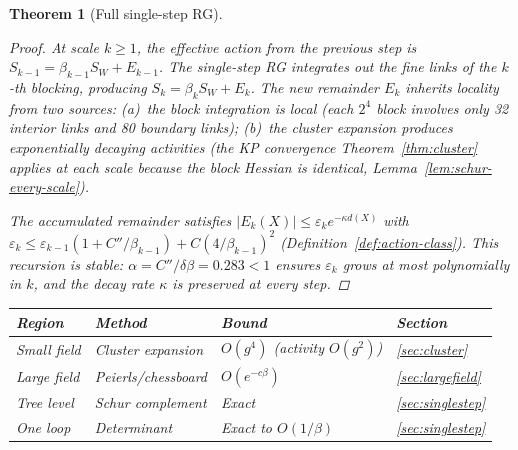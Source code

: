 \documentclass[11pt]{article}
\newtheorem{theorem}{Theorem}[section]
\theoremstyle{definition}
\begin{document}
\begin{theorem}[Full single-step RG]
\begin{proof}
At scale $k\ge 1$, the effective action from the previous step
is $S_{k-1}=\beta_{k-1}S_W+E_{k-1}$.  The single-step RG
integrates out the fine links of the $k$-th blocking, producing
$S_k=\beta_k S_W+E_k$.  The new remainder $E_k$ inherits
locality from two sources:
(a)~the block integration is local (each $2^4$ block involves
only 32 interior links and 80 boundary links);
(b)~the cluster expansion produces exponentially decaying
activities (the KP convergence Theorem~\ref{thm:cluster}
applies at each scale because the block Hessian is identical,
Lemma~\ref{lem:schur-every-scale}).

The accumulated remainder satisfies
$|E_k(X)|\le\varepsilon_k e^{-\kappa d(X)}$ with
$\varepsilon_k\le\varepsilon_{k-1}(1+C''/\beta_{k-1})+C(4/\beta_{k-1})^2$
(Definition~\ref{def:action-class}).
This recursion is stable: $\alpha=C''/\delta\beta=0.283<1$
ensures $\varepsilon_k$ grows at most polynomially in $k$,
and the decay rate $\kappa$ is preserved at every step.
\end{proof}

\begin{center}
\begin{tabular}{llll}
\toprule
\textbf{Region} & \textbf{Method} & \textbf{Bound} & \textbf{Section}\\
\midrule
Small field & Cluster expansion & $O(g^4)$ (activity $O(g^2)$) & \ref{sec:cluster}\\
Large field & Peierls/chessboard & $O(e^{-c\beta})$ &
\ref{sec:largefield}\\
Tree level & Schur complement & Exact & \ref{sec:singlestep}\\
One loop & Determinant & Exact to $O(1/\beta)$ & \ref{sec:singlestep}\\
\bottomrule
\end{tabular}
\end{center}
\end{theorem}
\end{document}
